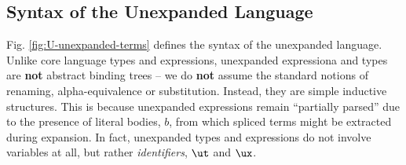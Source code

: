 \documentclass[acmsmall]{acmart}
\begin{document}
\subsection{Syntax of the Unexpanded Language}\label{sec:syntax-U}\label{sec:s-UL}
Fig. \ref{fig:U-unexpanded-terms} defines the syntax of the unexpanded language. Unlike core language types and expressions, unexpanded expressiona and types are \textbf{not} abstract binding trees -- we do \textbf{not} assume the standard notions of renaming, alpha-equivalence or substitution. Instead, they are simple inductive  structures. This is because unexpanded expressions remain ``partially parsed'' due to the presence of literal bodies, $b$, from which spliced terms might be extracted during expansion. In fact, unexpanded types and expressions do not involve variables at all, but rather \emph{identifiers}, $\ut$ and $\ux$. %

\end{document}
